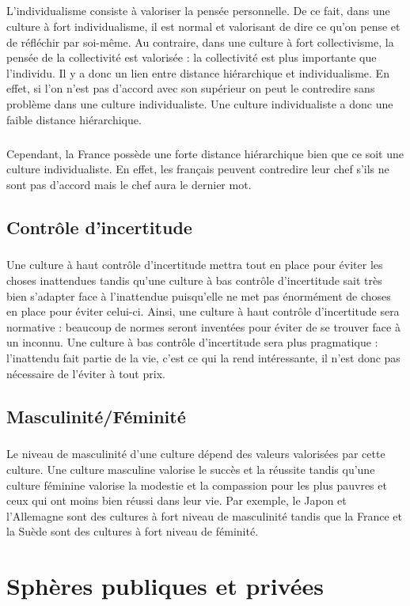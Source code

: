 \paragraph{}
L’individualisme consiste à valoriser la pensée personnelle. De ce fait, dans une culture à fort individualisme, il est normal et valorisant de dire ce qu’on pense et de réfléchir par soi-même. Au contraire, dans une culture à fort collectivisme, la pensée de la collectivité est valorisée : la collectivité est plus importante que l’individu. Il y a donc un lien entre distance hiérarchique et individualisme. En effet, si l’on n’est pas d’accord avec son supérieur on peut le contredire sans problème dans une culture individualiste. Une culture individualiste a donc une faible distance hiérarchique.
\paragraph{}
Cependant, la France possède une forte distance hiérarchique bien que ce soit une culture individualiste. En effet, les français peuvent contredire leur chef s’ils ne sont pas d’accord mais le chef aura le dernier mot. 

\section{Contrôle d'incertitude}
\paragraph{}
Une culture à haut contrôle d’incertitude mettra tout en place pour éviter les choses inattendues tandis qu’une culture à bas contrôle d’incertitude sait très bien s’adapter face à l’inattendue puisqu’elle ne met pas énormément de choses en place pour éviter celui-ci.  Ainsi, une culture à haut contrôle d’incertitude sera normative : beaucoup de normes seront inventées pour éviter de se trouver face à un inconnu. Une culture à bas contrôle d’incertitude sera plus pragmatique : l’inattendu fait partie de la vie, c’est ce qui la rend intéressante, il n’est donc pas nécessaire de l’éviter à tout prix. 

\section{Masculinité/Féminité}
\paragraph{}
Le niveau de masculinité d’une culture dépend des valeurs valorisées par cette culture. Une culture masculine valorise le succès et la réussite tandis qu’une culture féminine valorise la modestie et la compassion pour les plus pauvres et ceux qui ont moins bien réussi dans leur vie. Par exemple, le Japon et l’Allemagne sont des cultures à fort niveau de masculinité tandis que la France et la Suède sont des cultures à fort niveau de féminité. 

\chapter{Sphères publiques et privées}